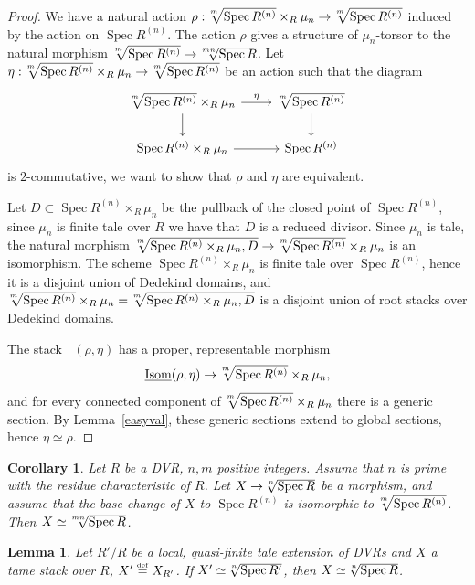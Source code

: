 \documentclass{amsart}
\numberwithin{equation}{section}
\numberwithin{subsection}{section}
\newtheorem{corollary}[theorem]{Corollary}
\newtheorem{lemma}[theorem]{Lemma}
\theoremstyle{definition}
\theoremstyle{remark}
\newcommand{\eqdef}{\mathrel{\smash{\overset{\mathrm{\scriptscriptstyle def}} =}}}
\newcommand\spec{\operatorname{Spec}}
\newcommand{\underisom}{\mathop{\underline{\mathrm{Isom}}}\nolimits}
\newcommand\radice[2][\relax]{\hspace{-1.5pt}\sqrt[\uproot{2}#1]{#2}}
\begin{document}
\begin{proof}
	We have a natural action $\rho:\radice[m]{\spec R^{(n)}}\times_{R}\mu_{n}\to \radice[m]{\spec R^{(n)}}$ induced by the action on $\spec R^{(n)}$. The action $\rho$ gives a structure of $\mu_{n}$-torsor to the natural morphism $\radice[m]{\spec R^{(n)}}\to\radice[mn]{\spec R}$. Let $\eta:\radice[m]{\spec R^{(n)}}\times_{R}\mu_{n}\to \radice[m]{\spec R^{(n)}}$ be an action such that the diagram
	\[\begin{tikzcd}
		\radice[m]{\spec R^{(n)}}\times_{R}\mu_{n}\dar\rar["\eta"]	&	\radice[m]{\spec R^{(n)}}\dar	\\
		\spec R^{(n)}\times_{R}\mu_{n}\rar							&	\spec R^{(n)}
	\end{tikzcd}\]
	is $2$-commutative, we want to show that $\rho$ and $\eta$ are equivalent.
	
	Let $D\subset \spec R^{(n)}\times_{R}\mu_{n}$ be the pullback of the closed point of $\spec R^{(n)}$, since $\mu_{n}$ is finite tale over $R$ we have that $D$ is a reduced divisor. Since $\mu_{n}$ is tale, the natural morphism $\radice[m]{\spec R^{(n)}\times_{R}\mu_{n},D}\to\radice[m]{\spec R^{(n)}}\times_{R}\mu_{n}$ is an isomorphism. The scheme $\spec R^{(n)}\times_{R}\mu_{n}$ is finite tale over $\spec R^{(n)}$, hence it is a disjoint union of Dedekind domains, and $\radice[m]{\spec R^{(n)}}\times_{R}\mu_{n}=\radice[m]{\spec R^{(n)}\times_{R}\mu_{n},D}$ is a disjoint union of root stacks over Dedekind domains.
	
	The stack $\underisom(\rho,\eta)$ has a proper, representable morphism 
	\[\underisom(\rho,\eta)\to \radice[m]{\spec R^{(n)}}\times_{R}\mu_{n},\]
	and for every connected component of $\radice[m]{\spec R^{(n)}}\times_{R}\mu_{n}$ there is a generic section. By Lemma~\ref{easyval}, these generic sections extend to global sections, hence $\eta\simeq \rho$.
\end{proof}

\begin{corollary}\label{rootbc}
	Let $R$ be a DVR, $n,m$ positive integers. Assume that $n$ is prime with the residue characteristic of $R$. Let $X\to\radice[n]{\spec R}$ be a morphism, and assume that the base change of $X$ to $\spec R^{(n)}$ is isomorphic to $\radice[m]{\spec R^{(n)}}$. Then $X\simeq\radice[mn]{\spec R}$.
\end{corollary}

\begin{lemma}\label{etale}
	Let $R'/R$ be a local, quasi-finite tale extension of DVRs and $X$ a tame stack over $R$, $X'\eqdef X_{R'}$. If $X'\simeq\radice[n]{\spec R'}$, then $X\simeq\radice[n]{\spec R}$.
\end{lemma}
\end{document}
